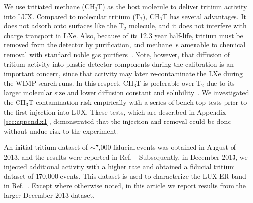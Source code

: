 We use tritiated methane (CH$_3$T) as the host molecule to deliver tritium activity into LUX. Compared to molecular tritium (T$_2$), CH$_3$T has several advantages. It does not adsorb onto surfaces like the T$_2$ molecule, and it does not interfere with charge transport in LXe. Also, because of its 12.3 year half-life, tritium must be removed from the detector by purification, and methane is amenable to chemical removal with standard noble gas purifiers~\cite{Dobi_CH4}. Note, however, that diffusion of tritium activity into plastic detector components during the calibration is an important concern, since that activity may later re-contaminate the LXe during the WIMP search runs.  In this respect, CH$_3$T is preferable over T$_2$ due to its larger molecular size and lower diffusion constant and solubility~\cite{miyake:1983}. We investigated the CH$_3$T contamination risk empirically with a series of bench-top tests prior to the first injection into LUX. These tests, which are described in Appendix \ref{sec:appendix1}, demonstrated that the injection and removal could be done without undue risk to the experiment. 

An initial tritium dataset of $\sim$7,000 fiducial events was obtained in August of 2013, and the results were reported in Ref.~\cite{lux-prl}. Subsequently, in December 2013, we injected additional activity with a higher rate and obtained a fiducial tritium dataset of 170,000 events. This dataset is used to characterize the LUX ER band in Ref.~\cite{lux-reanalysis}. Except where otherwise noted, in this article we report results from the larger December 2013 dataset.